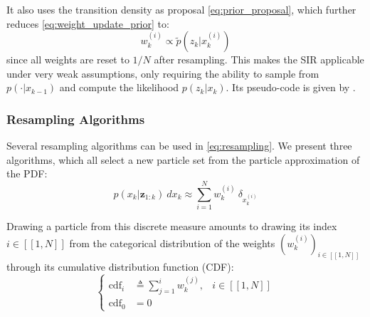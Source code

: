 It also uses the transition density as proposal \eqref{eq:prior_proposal}, which further reduces \eqref{eq:weight_update_prior} to:
\begin{equation}
	w_k^{(i)}\propto\tilde{p}\left(z_k|x_k^{(i)}\right)
\end{equation}
since all weights are reset to $1/N$ after resampling. This makes the SIR applicable under very weak assumptions, only requiring the ability to sample from $p(\cdot|x_{k-1})$ and compute the likelihood $p(z_k|x_k)$. Its pseudo-code is given by .

\begin{algorithm}[H]
	\begin{algorithmic}
	\end{algorithmic}\caption{Sampling Importance Resampling}\label{alg:SIR}
\end{algorithm}

\subsubsection{Resampling Algorithms}

Several resampling algorithms can be used in \eqref{eq:resampling}. We present three algorithms, which all select a new particle set from the particle approximation of the PDF:
\begin{equation}
	p(x_k|\mathbf{z}_{1:k})\:dx_k\approx\sum_{i=1}^Nw_k^{(i)}\:\delta_{x_k^{(i)}}
\end{equation}

Drawing a particle from this discrete measure amounts to drawing its index $i\in[\![1,N]\!]$ from the categorical distribution of the weights $\left(w_k^{(i)}\right)_{i\in[\![1,N]\!]}$ through its cumulative distribution function (CDF):
\begin{equation}
	\left\{\begin{aligned}
	\operatorname{cdf}_i&\triangleq\sum_{j=1}^i w_k^{(j)},&i\in[\![1,N]\!]\\
	\operatorname{cdf}_0&=0
	\end{aligned}\right.
\end{equation}

